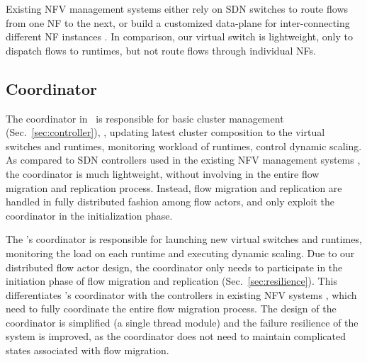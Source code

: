 
Existing NFV management systems either rely on SDN switches \cite{gember2012stratos, gember2015opennf} to route flows from one NF to the next, or build a customized data-plane for inter-connecting different NF instances \cite{palkar2015e2}. In comparison, our virtual switch is lightweight, only to dispatch flows to runtimes, but not route flows through individual NFs.


\subsection{Coordinator}
\label{sec:coordinator}

The coordinator in \nfactor~is responsible for basic cluster management (Sec.~\ref{sec:controller}), \eg, updating latest cluster composition to the virtual switches and runtimes, monitoring workload of runtimes, control dynamic scaling. %
As compared to SDN controllers used in the existing NFV management systems \cite{gember2015opennf, rajagopalan2013split}%
, the coordinator is much lightweight, without involving in the entire flow migration and replication process.%
 Instead, flow migration and replication are handled in fully distributed fashion among flow actors, and only exploit the coordinator in the initialization phase.


The \nfactor's coordinator is responsible for launching new virtual switches and runtimes, monitoring the load on each runtime and executing dynamic scaling. Due to our distributed flow actor design, the coordinator only needs to participate in the initiation phase of flow migration and replication (Sec.~\ref{sec:resilience}). This differentiates \nfactor's coordinator with the controllers in existing NFV systems \cite{gember2015opennf}\cite{rajagopalan2013split}, which need to fully coordinate the entire flow migration process.
The design of the coordinator is simplified (a single thread module) and the failure resilience of the system is improved, as the coordinator does not need to maintain complicated states associated with flow migration.

